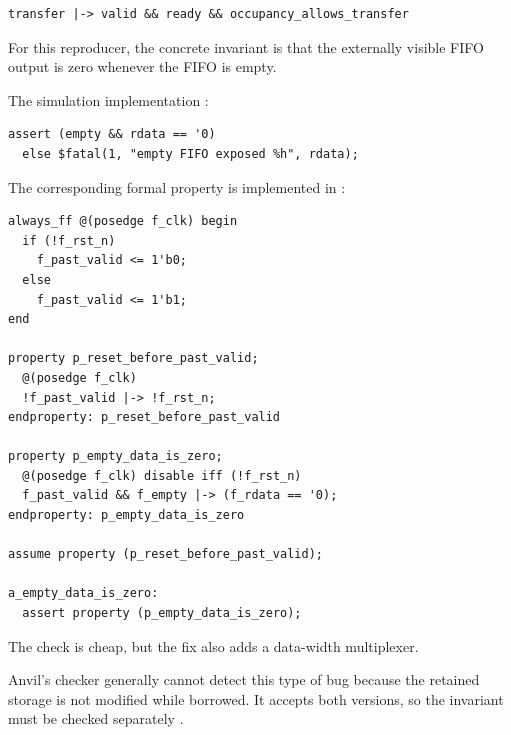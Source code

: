 \documentclass[conference]{IEEEtran}
\begin{document}
\begin{lstlisting}
transfer |-> valid && ready && occupancy_allows_transfer
\end{lstlisting}

For this reproducer, the concrete invariant is that the externally
visible FIFO output is zero whenever the FIFO is empty.

The simulation implementation \cite{bug2-simulation-check}:

\begin{lstlisting}
assert (empty && rdata == '0)
  else $fatal(1, "empty FIFO exposed %h", rdata);
\end{lstlisting}

The corresponding formal property is implemented in
\cite{bug2-formal-check}:

\begin{lstlisting}
always_ff @(posedge f_clk) begin
  if (!f_rst_n)
    f_past_valid <= 1'b0;
  else
    f_past_valid <= 1'b1;
end

property p_reset_before_past_valid;
  @(posedge f_clk)
  !f_past_valid |-> !f_rst_n;
endproperty: p_reset_before_past_valid

property p_empty_data_is_zero;
  @(posedge f_clk) disable iff (!f_rst_n)
  f_past_valid && f_empty |-> (f_rdata == '0);
endproperty: p_empty_data_is_zero

assume property (p_reset_before_past_valid);

a_empty_data_is_zero:
  assert property (p_empty_data_is_zero);
\end{lstlisting}

The check is cheap, but the fix also adds a data-width multiplexer.

Anvil's checker generally cannot detect this type of bug because the retained
storage is not modified while borrowed. It accepts both versions, so the
invariant must be checked separately
\cite{bug2-anvil-buggy,bug2-anvil-fixed,bug2-anvil-results}.

\end{document}
